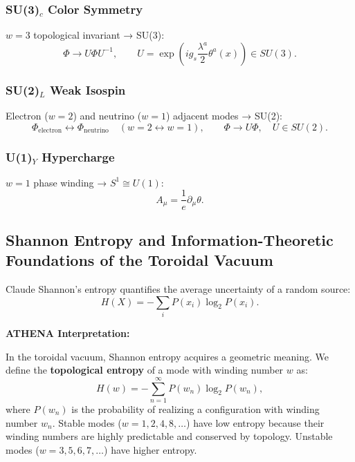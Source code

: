 \documentclass[12pt, a4paper]{article}
\begin{document}
\subsubsection{SU(3)$_c$ Color Symmetry}
$w=3$ topological invariant → SU(3):
\begin{equation}
\Phi \to U \Phi U^{-1}, \qquad U = \exp\left( i g_s \frac{\lambda^a}{2} \theta^a(x) \right) \in SU(3).
\label{eq:su3}
\end{equation}

\subsubsection{SU(2)$_L$ Weak Isospin}
Electron ($w=2$) and neutrino ($w=1$) adjacent modes → SU(2):
\begin{equation}
\Phi_{\mathrm{electron}} \leftrightarrow \Phi_{\mathrm{neutrino}} \quad (w=2 \leftrightarrow w=1), \qquad \Phi \to U \Phi, \quad U \in SU(2).
\label{eq:su2}
\end{equation}

\subsubsection{U(1)$_Y$ Hypercharge}
$w=1$ phase winding → $S^1 \cong U(1)$:
\begin{equation}
A_\mu = \frac{1}{e} \partial_\mu \theta.
\label{eq:u1}
\end{equation}

\subsection{Shannon Entropy and Information-Theoretic Foundations of the Toroidal Vacuum}
\label{sec:shannon_entropy}

Claude Shannon's entropy quantifies the average uncertainty of a random source:
\begin{equation}
H(X) = -\sum_{i} P(x_i) \log_2 P(x_i).
\label{eq:shannon_entropy}
\end{equation}

\textbf{ATHENA Interpretation:}

In the toroidal vacuum, Shannon entropy acquires a geometric meaning. We define the \textbf{topological entropy} of a mode with winding number $w$ as:
\begin{equation}
H(w) = -\sum_{n=1}^{\infty} P(w_n) \log_2 P(w_n),
\label{eq:topological_entropy}
\end{equation}
where $P(w_n)$ is the probability of realizing a configuration with winding number $w_n$. Stable modes ($w = 1,2,4,8,\dots$) have low entropy because their winding numbers are highly predictable and conserved by topology. Unstable modes ($w = 3,5,6,7,\dots$) have higher entropy.
\end{document}
